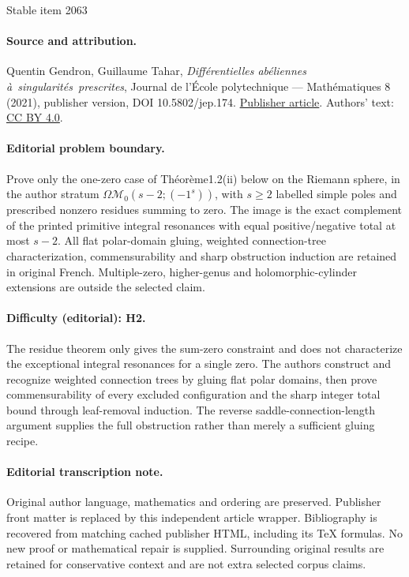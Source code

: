 \documentclass[11pt]{article}
\numberwithin{equation}{section}\renewcommand{\proofname}{Démonstration}
\let\mathcal\mathscr
\theoremstyle{definition}
\begin{document}
\begin{center}{\Large Stable item 2063}\end{center}
\paragraph{Source and attribution.}
Quentin Gendron, Guillaume Tahar, \emph{Différentielles abéliennes à singularités prescrites}, Journal de l’École polytechnique — Mathématiques 8 (2021), publisher version, DOI 10.5802/jep.174. \href{https://jep.centre-mersenne.org/articles/10.5802/jep.174/}{Publisher article}. Authors' text: \href{https://creativecommons.org/licenses/by/4.0/}{CC BY 4.0}.
\paragraph{Editorial problem boundary.}
Prove only the one-zero case of Théorème1.2(ii) below on the Riemann sphere, in the author stratum \(\Omega\mathcal M_0(s-2;(-1^s))\), with \(s\ge2\) labelled simple poles and prescribed nonzero residues summing to zero. The image is the exact complement of the printed primitive integral resonances with equal positive/negative total at most \(s-2\). All flat polar-domain gluing, weighted connection-tree characterization, commensurability and sharp obstruction induction are retained in original French. Multiple-zero, higher-genus and holomorphic-cylinder extensions are outside the selected claim.
\paragraph{Difficulty (editorial): H2.}
The residue theorem only gives the sum-zero constraint and does not characterize the exceptional integral resonances for a single zero. The authors construct and recognize weighted connection trees by gluing flat polar domains, then prove commensurability of every excluded configuration and the sharp integer total bound through leaf-removal induction. The reverse saddle-connection-length argument supplies the full obstruction rather than merely a sufficient gluing recipe.
\paragraph{Editorial transcription note.}
Original author language, mathematics and ordering are preserved. Publisher front matter is replaced by this independent article wrapper. Bibliography is recovered from matching cached publisher HTML, including its TeX formulas. No new proof or mathematical repair is supplied. Surrounding original results are retained for conservative context and are not extra selected corpus claims.
\clearpage
\end{document}
